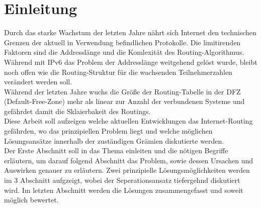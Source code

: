 \section{Einleitung}
Durch das starke Wachstum der letzten Jahre nährt sich Internet den technischen Grenzen der aktuell in Verwendung befindlichen Protokolle. Die limitirenden Faktoren sind die Addresslänge und die Komlexität des Routing-Algorithmus. Während mit IPv6 das Problem der Addresslänge weitgehend gelöst wurde, bleibt noch offen wie die Routing-Struktur für die wachsenden Teilnehmerzahlen verändert werden soll. \\

Während der letzten Jahre wuchs die Größe der Routing-Tabelle in der DFZ (Default-Free-Zone) mehr als linear zur Anzahl der verbundenen Systeme und gefährdet damit die Sklaierbakeit des Routings. \\

Diese Arbeit soll aufzeigen welche aktuellen Entwicklungen das Internet-Routing gefährden, wo das prinzipiellen Problem liegt und welche möglichen Lösungsansätze innerhalb der zuständigen Grämien diskutierte werden. \\

Der Erste Abschnitt soll in das Thema einleiten und die nötigen Begriffe erläutern, um darauf folgend Abschnitt das Problem, sowie dessen Ursachen und Auswirken genauer zu erläutern. Zwei prinzipielle Lösungsmöglichkeiten werden im 3 Abschnitt aufgzeigt, wobei der Seperationsansatz tiefergehnd diskutiert wird. Im letzten Abschnitt werden die Lösungen zusammengefasst und soweit möglich bewertet.

 
